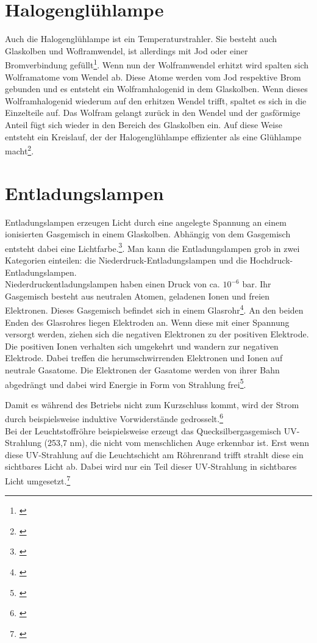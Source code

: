 \section{Halogenglühlampe} \label{sec_halogenglühlampe}
Auch die Halogenglühlampe ist ein Temperaturstrahler. Sie besteht auch Glaskolben und Woflramwendel, ist allerdings mit Jod oder einer Bromverbindung gefüllt\footnote{\cite[82]{ris}}.
Wenn nun der Wolframwendel erhitzt wird spalten sich Wolframatome vom Wendel ab. Diese Atome werden vom Jod respektive Brom gebunden und es entsteht ein Wolframhalogenid in dem Glaskolben. Wenn dieses Wolframhalogenid wiederum auf den erhitzen Wendel trifft, spaltet es sich in die Einzelteile auf. Das Wolfram gelangt zurück in den Wendel und der gasförmige Anteil fügt sich wieder in den Bereich des Glaskolben ein. Auf diese Weise entsteht ein Kreislauf, der der Halogenglühlampe effizienter als eine Glühlampe macht\footnote{\cite[83-84]{ris}}.

\section{Entladungslampen} \label{sec_entladungslampe}
Entladungslampen erzeugen Licht durch eine angelegte Spannung an einem ionisierten Gasgemisch in einem Glaskolben. Abhängig von dem Gasgemisch entsteht dabei eine Lichtfarbe.\footnote{\cite[140]{mueller}}. Man kann die Entladungslampen grob in zwei Kategorien einteilen: die Niederdruck-Entladungslampen und die Hochdruck-Entladungslampen.\\

Niederdruckentladungslampen haben einen Druck von ca. $10^{-6}$ bar. Ihr Gasgemisch besteht aus neutralen Atomen, geladenen Ionen und freien Elektronen. Dieses Gasgemisch befindet sich in einem Glasrohr\footnote{\cite[93]{ris}}. 
An den beiden Enden des Glasrohres liegen Elektroden an. Wenn diese mit einer Spannung versorgt werden, ziehen sich die negativen Elektronen zu der positiven Elektrode. Die positiven Ionen verhalten sich umgekehrt und wandern zur negativen Elektrode. Dabei treffen die herumschwirrenden Elektronen und Ionen auf neutrale Gasatome. Die Elektronen der Gasatome werden von ihrer Bahn abgedrängt und dabei wird Energie in Form von Strahlung frei\footnote{\cite[93]{ris}}. 

Damit es während des Betriebs nicht zum Kurzschluss kommt, wird der Strom durch beispielsweise induktive Vorwiderstände gedrosselt.\footnote{\cite[141]{mueller}}\\
Bei der Leuchtstoffröhre beispielsweise erzeugt das Quecksilbergasgemisch UV-Strahlung (253,7 nm), die nicht vom menschlichen Auge erkennbar ist. Erst wenn diese UV-Strahlung auf die Leuchtschicht am Röhrenrand trifft strahlt diese ein sichtbares Licht ab. Dabei wird nur ein Teil dieser UV-Strahlung in sichtbares Licht umgesetzt.\footnote{\cite[96]{ris}}


